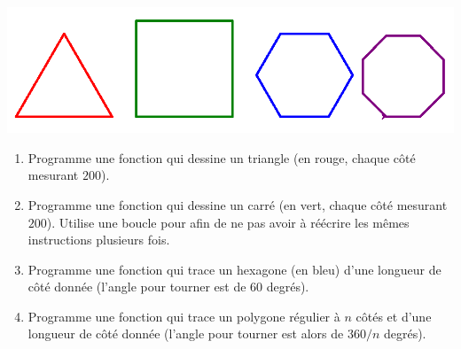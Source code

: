\documentclass[11pt,class=report,crop=false]{standalone}
\begin{document}
\begin{activite}[Tortue]


\begin{center}
\includegraphics[scale=0.4]{ecran-fonctions-tortue}
\end{center}

\begin{enumerate}
  \item Programme une fonction  qui dessine un triangle (en rouge, chaque côté mesurant $200$).

  \item Programme une fonction  qui dessine un carré (en vert, chaque côté mesurant $200$). Utilise une boucle \og{}pour\fg{} afin de ne pas avoir à réécrire les mêmes instructions plusieurs fois.  
  
  \item Programme une fonction  qui trace un hexagone (en bleu) d'une longueur de côté donnée (l'angle pour tourner est de $60$ degrés).
  
  
  \item Programme une fonction  qui trace un polygone régulier à $n$ côtés et d'une longueur de côté donnée (l'angle pour tourner est alors de $360/n$ degrés). 
\end{enumerate}

\end{activite}




\end{document}
